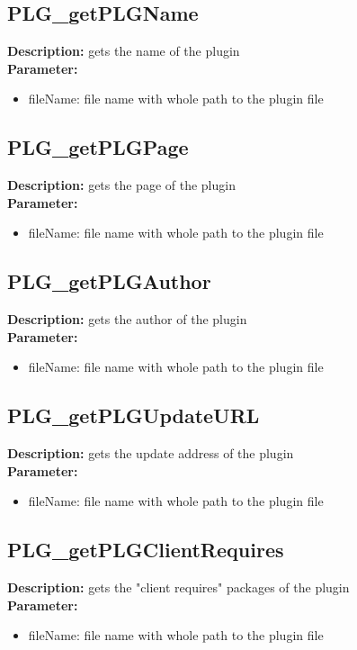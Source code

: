\subsection{PLG\_getPLGName}
\textbf{Description:} gets the name of the plugin\\
\textbf{Parameter:}
\begin{itemize}
\item fileName: file name with whole path to the plugin file
\end{itemize}

\subsection{PLG\_getPLGPage}
\textbf{Description:} gets the page of the plugin\\
\textbf{Parameter:}
\begin{itemize}
\item fileName: file name with whole path to the plugin file
\end{itemize}

\subsection{PLG\_getPLGAuthor}
\textbf{Description:} gets the author of the plugin\\
\textbf{Parameter:}
\begin{itemize}
\item fileName: file name with whole path to the plugin file
\end{itemize}

\subsection{PLG\_getPLGUpdateURL}
\textbf{Description:} gets the update address of the plugin\\
\textbf{Parameter:}
\begin{itemize}
\item fileName: file name with whole path to the plugin file
\end{itemize}

\subsection{PLG\_getPLGClientRequires}
\textbf{Description:} gets the "client requires" packages of the plugin\\
\textbf{Parameter:}
\begin{itemize}
\item fileName: file name with whole path to the plugin file
\end{itemize}

